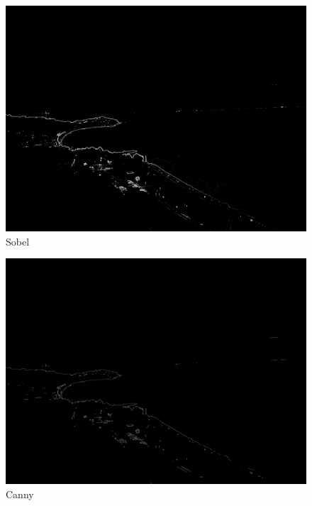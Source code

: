 \begin{figure}[H]  %
	\centering
	\includegraphics[width=1\textwidth]{8Misc/Pictures/Introduction/landsobel.JPG}
	\caption{Sobel}
	\label{fig: convolve3}
\end{figure}

\begin{figure}[H]  %
	\centering
	\includegraphics[width=1\textwidth]{8Misc/Pictures/Introduction/landcanny.JPG}
	\caption{Canny}
	\label{fig: convolve4}
\end{figure}







